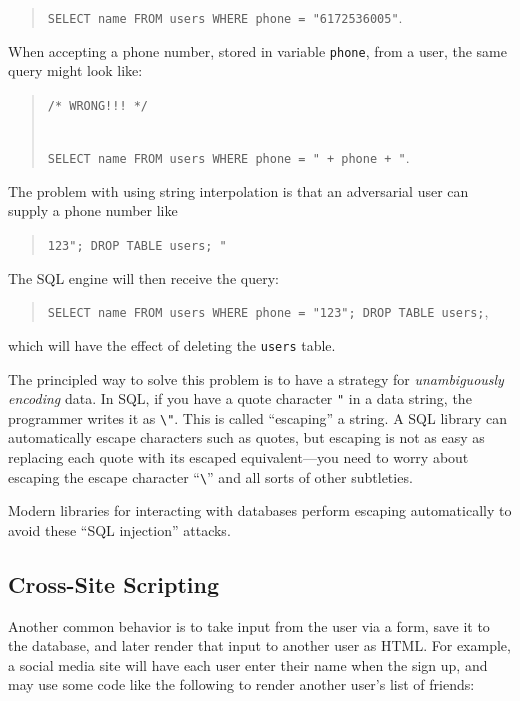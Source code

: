 \documentclass[
  letterpaper,
]{scrbook}
\theoremstyle{definition}
\theoremstyle{plain}
\theoremstyle{plain}
\theoremstyle{remark}
\begin{document}
\begin{quote}
\texttt{\textquotesingle{}SELECT\ name\ FROM\ users\ WHERE\ phone\ =\ "6172536005"\textquotesingle{}}.
\end{quote}

When accepting a phone number, stored in variable \texttt{phone}, from a
user, the same query might look like:

\begin{quote}
\texttt{/*\ WRONG!!!\ */}\strut \\
\texttt{\textquotesingle{}SELECT\ name\ FROM\ users\ WHERE\ phone\ =\ "\textquotesingle{}\ +\ phone\ +\ \textquotesingle{}"\textquotesingle{}}.
\end{quote}

The problem with using string interpolation is that an adversarial user
can supply a phone number like

\begin{quote}
\texttt{123";\ DROP\ TABLE\ users;\ "}
\end{quote}

The SQL engine will then receive the query:

\begin{quote}
\texttt{\textquotesingle{}SELECT\ name\ FROM\ users\ WHERE\ phone\ =\ "123";\ DROP\ TABLE\ users;\textquotesingle{}},
\end{quote}

which will have the effect of deleting the \texttt{users} table.

The principled way to solve this problem is to have a strategy for
\emph{unambiguously encoding} data. In SQL, if you have a quote
character \texttt{"} in a data string, the programmer writes it as
\texttt{\textbackslash{}"}. This is called ``escaping'' a string. A SQL
library can automatically escape characters such as quotes, but escaping
is not as easy as replacing each quote with its escaped equivalent---you
need to worry about escaping the escape character
``\texttt{\textbackslash{}}'' and all sorts of other subtleties.

Modern libraries for interacting with databases perform escaping
automatically to avoid these ``SQL injection'' attacks.

\subsection{Cross-Site Scripting}\label{cross-site-scripting}

Another common behavior is to take input from the user via a form, save
it to the database, and later render that input to another user as HTML.
For example, a social media site will have each user enter their name
when the sign up, and may use some code like the following to render
another user's list of friends:
\end{document}
